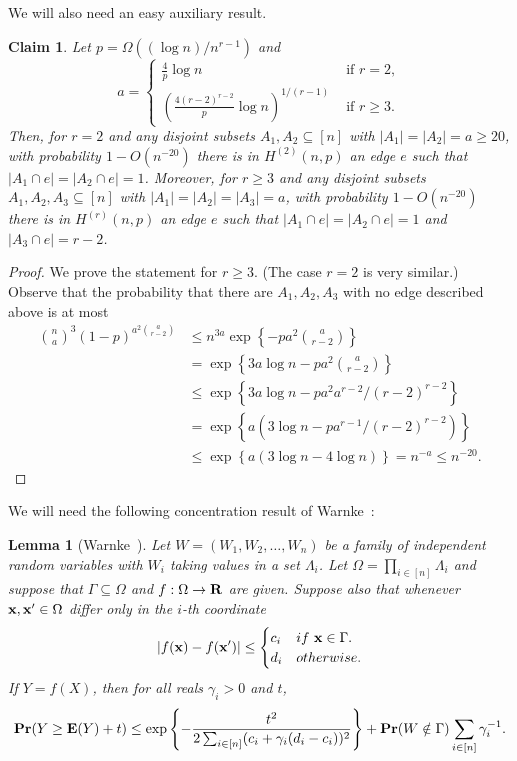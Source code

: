\documentclass[12pt,reqno]{amsart}
\newtheorem{lemma}[theorem]{Lemma}
\newtheorem{claim}[theorem]{Claim}
\theoremstyle{remark}
\def\bx{{\bf x}}
\newcommand{\set}[1]{\left\{#1\right\}}
\def\E{\mbox{{\bf E}}}
\def\Pr{\mbox{{\bf Pr}}}
\def\E{\mbox{{\bf E}}}
\def\Pr{\mbox{{\bf Pr}}}
\begin{document}
We will also need an easy auxiliary result. 
\begin{claim}\label{claim:connector}
Let $p=\Omega((\log n)/n^{r-1})$ and
\[
a=
\begin{cases}
\frac{4}{p} \log n & \text{ if } r=2,\\
\left(\frac{4(r-2)^{r-2}}{p} \log n \right)^{1/(r-1)} & \text{ if } r\ge3. 
\end{cases}
\]
Then, for $r=2$ and any disjoint subsets $A_1,  A_2 \subseteq [n]$ with $|A_1|=|A_2|=a\geq 20$, with probability $1-O(n^{-20})$ there is in $H^{(2)}(n, p)$ an edge $e$ such that $|A_1\cap e| = |A_2\cap e| = 1$.
Moreover, for $r\ge 3$ and any disjoint subsets $A_1, A_2, A_3 \subseteq [n]$ with $|A_1|=|A_2|=|A_3|=a$, with probability $1-O(n^{-20})$ there is in $H^{(r)}(n, p)$ an edge $e$ such that $|A_1\cap e| = |A_2\cap e| = 1$ and $|A_3\cap e| = r-2$. 
\end{claim}
\begin{proof}
We prove the statement for $r\ge 3$. (The case $r=2$ is very similar.)
Observe that the probability that there are $A_1, A_2, A_3$ with no edge described above is at most
\begin{align*}
\binom{n}{a}^3 (1-p)^{a^2 \binom{a}{r-2}} 
&\le n^{3a} \exp\left\{-pa^2 \binom{a}{r-2}\right\}\\
&= \exp\left\{3a\log n-pa^2 \binom{a}{r-2}\right\}\\
&\le \exp\left\{3a\log n-pa^2 a^{r-2}/(r-2)^{r-2}\right\}\\
&= \exp\left\{a\left(3\log n-pa^{r-1}/(r-2)^{r-2}\right)\right\}\\
&\le \exp\left\{a(3\log n-4\log n)\right\} = n^{-a}\le n^{-20}.
\end{align*}
\end{proof}
We will need the following concentration result of Warnke~\cite{W}:
\begin{lemma}[Warnke~\cite{W}]\label{warnke}
Let $W=(W_1,W_2,\ldots,W_n)$ be a family of independent random variables with $W_i$ taking values in a set $\Lambda_i$. Let $\Omega=\prod_{i\in[n]}\Lambda_i$ and suppose that $\Gamma\subseteq \Omega$ and $f:\Omega\to{\bf R}$ are given. Suppose also that whenever $\bx,\bx'\in \Omega$ differ only in the $i$-th coordinate 
\[
|f(\bx)-f(\bx')|\leq \begin{cases}c_i&if\ \bx\in\Gamma.\\d_i&otherwise.\end{cases}
\]
If $Y=f(X)$, then for all reals $\gamma_i>0$ and $t$,
\begin{equation}\label{Wineq}
\Pr(Y\geq \E(Y)+t)\leq \exp\set{-\frac{t^2}{2\sum_{i\in[n]}(c_i+\gamma_i(d_i-c_i))^2}}+\Pr(W\notin \Gamma)\sum_{i\in [n]}\gamma_i^{-1}.
\end{equation}
\end{lemma}
\end{document}
